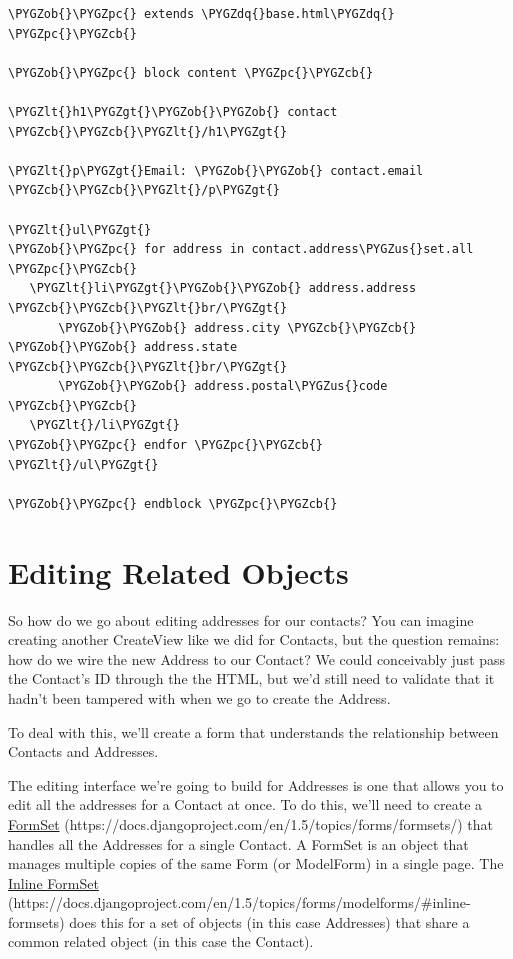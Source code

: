 \documentclass[letterpaper,10pt,english]{sphinxmanual}
\def\PYGZus{\char`\_}
\def\PYGZob{\char`\{}
\def\PYGZcb{\char`\}}
\def\PYGZlt{\char`\<}
\def\PYGZgt{\char`\>}
\def\PYGZpc{\char`\%}
\def\PYGZdq{\char`\"}
\begin{document}
\begin{Verbatim}[commandchars=\\\{\}]
\PYGZob{}\PYGZpc{} extends \PYGZdq{}base.html\PYGZdq{} \PYGZpc{}\PYGZcb{}

\PYGZob{}\PYGZpc{} block content \PYGZpc{}\PYGZcb{}

\PYGZlt{}h1\PYGZgt{}\PYGZob{}\PYGZob{} contact \PYGZcb{}\PYGZcb{}\PYGZlt{}/h1\PYGZgt{}

\PYGZlt{}p\PYGZgt{}Email: \PYGZob{}\PYGZob{} contact.email \PYGZcb{}\PYGZcb{}\PYGZlt{}/p\PYGZgt{}

\PYGZlt{}ul\PYGZgt{}
\PYGZob{}\PYGZpc{} for address in contact.address\PYGZus{}set.all \PYGZpc{}\PYGZcb{}
   \PYGZlt{}li\PYGZgt{}\PYGZob{}\PYGZob{} address.address \PYGZcb{}\PYGZcb{}\PYGZlt{}br/\PYGZgt{}
       \PYGZob{}\PYGZob{} address.city \PYGZcb{}\PYGZcb{} \PYGZob{}\PYGZob{} address.state \PYGZcb{}\PYGZcb{}\PYGZlt{}br/\PYGZgt{}
       \PYGZob{}\PYGZob{} address.postal\PYGZus{}code \PYGZcb{}\PYGZcb{}
   \PYGZlt{}/li\PYGZgt{}
\PYGZob{}\PYGZpc{} endfor \PYGZpc{}\PYGZcb{}
\PYGZlt{}/ul\PYGZgt{}

\PYGZob{}\PYGZpc{} endblock \PYGZpc{}\PYGZcb{}
\end{Verbatim}


\section{Editing Related Objects}
\label{tutorial/related:editing-related-objects}
So how do we go about editing addresses for our contacts? You can
imagine creating another CreateView like we did for Contacts, but the
question remains: how do we wire the new Address to our Contact? We
could conceivably just pass the Contact's ID through the the HTML, but
we'd still need to validate that it hadn't been tampered with when we
go to create the Address.

To deal with this, we'll create a form that understands the
relationship between Contacts and Addresses.

The editing interface we're going to build for Addresses is one that
allows you to edit all the addresses for a Contact at once. To do
this, we'll need to create a \href{https://docs.djangoproject.com/en/1.5/topics/forms/formsets/}{FormSet} (https://docs.djangoproject.com/en/1.5/topics/forms/formsets/) that handles all the Addresses
for a single Contact. A FormSet is an object that manages multiple
copies of the same Form (or ModelForm) in a single page. The \href{https://docs.djangoproject.com/en/1.5/topics/forms/modelforms/\#inline-formsets}{Inline
FormSet} (https://docs.djangoproject.com/en/1.5/topics/forms/modelforms/\#inline-formsets) does this for a set of objects (in this case Addresses) that
share a common related object (in this case the Contact).
\end{document}
